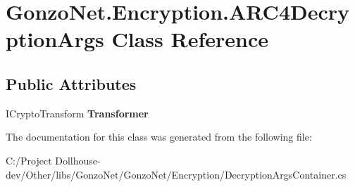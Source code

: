 \hypertarget{class_gonzo_net_1_1_encryption_1_1_a_r_c4_decryption_args}{\section{Gonzo\+Net.\+Encryption.\+A\+R\+C4\+Decryption\+Args Class Reference}
\label{class_gonzo_net_1_1_encryption_1_1_a_r_c4_decryption_args}
}
\subsection*{Public Attributes}
\begin{DoxyCompactItemize}
\item 
\hypertarget{class_gonzo_net_1_1_encryption_1_1_a_r_c4_decryption_args_ab85c7126fb25338680a89d6b23b79476}{I\+Crypto\+Transform {\bfseries Transformer}}\label{class_gonzo_net_1_1_encryption_1_1_a_r_c4_decryption_args_ab85c7126fb25338680a89d6b23b79476}

\end{DoxyCompactItemize}


The documentation for this class was generated from the following file\+:\begin{DoxyCompactItemize}
\item 
C\+:/\+Project Dollhouse-\/dev/\+Other/libs/\+Gonzo\+Net/\+Gonzo\+Net/\+Encryption/Decryption\+Args\+Container.\+cs\end{DoxyCompactItemize}
